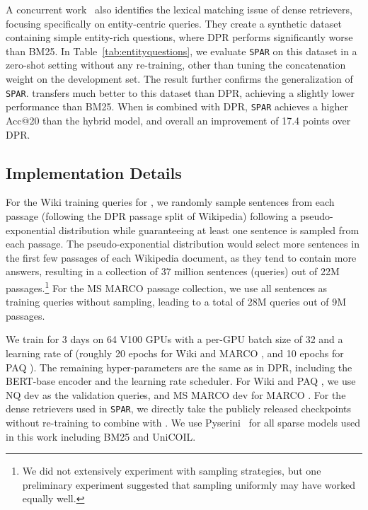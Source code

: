 \documentclass[11pt]{article}
\newcommand{\spar}{\texttt{SPAR}\xspace}
\newcommand{\lexmodelsymbol}{\xspace}
\begin{document}
A concurrent work~\cite{sciavolino2021simple} also identifies the lexical matching issue of dense retrievers, focusing specifically on entity-centric queries.
They create a synthetic dataset containing simple entity-rich questions, where DPR performs significantly worse than BM25.
In Table~\ref{tab:entityquestions}, we evaluate \spar{} on this dataset in a zero-shot setting without any re-training, other than tuning the concatenation weight on the development set.
The result further confirms the generalization of \spar{}.
\lexmodelsymbol{} transfers much better to this dataset than DPR, achieving a slightly lower performance than BM25.
When \lexmodelsymbol{} is combined with DPR,  \spar{} achieves a higher Acc@20 than the hybrid model, and overall an improvement of 17.4 points over DPR.

\subsection{Implementation Details}\label{sec:exp:implementation}

For the Wiki training queries for \lexmodelsymbol{}, we randomly sample sentences from each passage (following the DPR passage split of Wikipedia) following a pseudo-exponential distribution while guaranteeing at least one sentence is sampled from each passage.
The pseudo-exponential distribution would select more sentences in the first few passages of each Wikipedia document, as they tend to contain more answers, resulting in a collection of 37 million sentences (queries) out of 22M passages.\footnote{We did not extensively experiment with sampling strategies, but one preliminary experiment suggested that sampling uniformly may have worked equally well.}
For the MS MARCO passage collection, we use all sentences as training queries without sampling, leading to a total of 28M queries out of 9M passages.

We train \lexmodelsymbol{} for 3 days on 64 V100 GPUs with a per-GPU batch size of 32 and a learning rate of  (roughly 20 epochs for Wiki \lexmodelsymbol{} and MARCO \lexmodelsymbol{}, and 10 epochs for PAQ \lexmodelsymbol{}).
The remaining hyper-parameters are the same as in DPR, including the BERT-base encoder and the learning rate scheduler.
For Wiki and PAQ \lexmodelsymbol{}, we use NQ dev as the validation queries, and MS MARCO dev for MARCO \lexmodelsymbol{}.
For the dense retrievers used in \spar{}, we directly take the publicly released checkpoints without re-training to combine with \lexmodelsymbol{}.
We use Pyserini~\cite{pyserini} for all sparse models used in this work including BM25 and UniCOIL.
\end{document}
